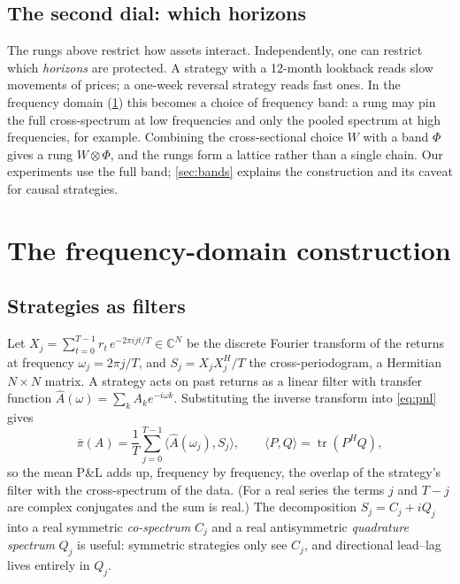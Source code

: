 \documentclass[11pt]{article}
\theoremstyle{definition}
\theoremstyle{remark}
\newcommand{\C}{\mathbb{C}}
\newcommand{\ip}[2]{\langle #1, #2 \rangle}
\newcommand{\tr}{\operatorname{tr}}
\newcommand{\pnl}{\bar{\pi}}
\begin{document}
\subsection{The second dial: which horizons}

The rungs above restrict how assets interact. Independently, one can restrict which \emph{horizons} are protected. A strategy with a 12-month
lookback reads slow movements of prices; a one-week reversal strategy reads fast ones. In the frequency domain (\cref{sec:freq}) this becomes a choice of
frequency band: a rung may pin the full cross-spectrum at low frequencies and only the pooled spectrum at high frequencies, for example.
Combining the cross-sectional choice $W$ with a band $\Phi$ gives a rung $W\otimes\Phi$, and the rungs form a lattice rather than a single chain.
Our experiments use the full band; \cref{sec:bands} explains the construction and its caveat for causal strategies.

\section{The frequency-domain construction}
\label{sec:freq}

\subsection{Strategies as filters}

Let $X_j=\sum_{t=0}^{T-1} r_t\,e^{-2\pi i jt/T}\in\C^N$ be the discrete Fourier transform of the returns at frequency $\omega_j=2\pi j/T$, and
$S_j=X_jX_j^{H}/T$ the cross-periodogram, a Hermitian $N\times N$ matrix. A strategy acts on past returns as a linear filter with transfer function
$\hat A(\omega)=\sum_{k} A_k e^{-i\omega k}$. Substituting the inverse transform into \eqref{eq:pnl} gives
\begin{equation}\label{eq:pnlfreq}
  \pnl(A)=\frac1T\sum_{j=0}^{T-1}\ip{\hat A(\omega_j)}{S_j},\qquad \ip{P}{Q}=\tr(P^HQ),
\end{equation}
so the mean P\&L adds up, frequency by frequency, the overlap of the strategy's filter with the cross-spectrum of the data. (For a real series the terms
$j$ and $T-j$ are complex conjugates and the sum is real.) The decomposition $S_j=C_j+iQ_j$ into a real symmetric \emph{co-spectrum} $C_j$ and a real
antisymmetric \emph{quadrature spectrum} $Q_j$ is useful: symmetric strategies only see $C_j$, and directional lead--lag lives entirely in $Q_j$.
\end{document}
